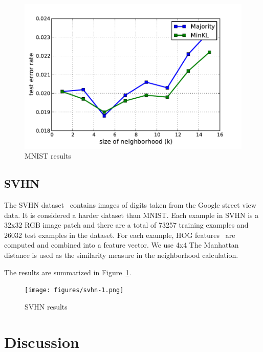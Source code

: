 \documentclass{article}
\begin{document}
\begin{figure}[ht]
\vskip 0.2in
\begin{center}
\centering
  \includegraphics[width=.95\linewidth]{figures/icml-mnist-error.pdf}
  \caption{MNIST results}
  \label{fig:mnist-results}
\end{center}
\vskip -0.2in
\end{figure}


\subsection{SVHN}
The SVHN dataset~\cite{Netzer2011} contains images of digits taken
from the Google street view data. It is considered a harder dataset
than MNIST. Each example in SVHN is a 32x32 RGB image patch and there
are a total of 73257 training examples and 26032 test examples in the
dataset. For each example, HOG features~\cite{Dalal2005} are computed
and combined into a feature vector. We use 4x4 The Manhattan distance is used as
the similarity measure in the neighborhood calculation.

The results are summarized in Figure~\ref{}.

\begin{figure}[ht]
\vskip 0.2in
\begin{center}
\centering
  \texttt{[image: figures/svhn-1.png]}
  \caption{SVHN results}
  \label{fig:svhn-results}
\end{center}
\vskip -0.2in
\end{figure}

\section{Discussion}
\end{document}
